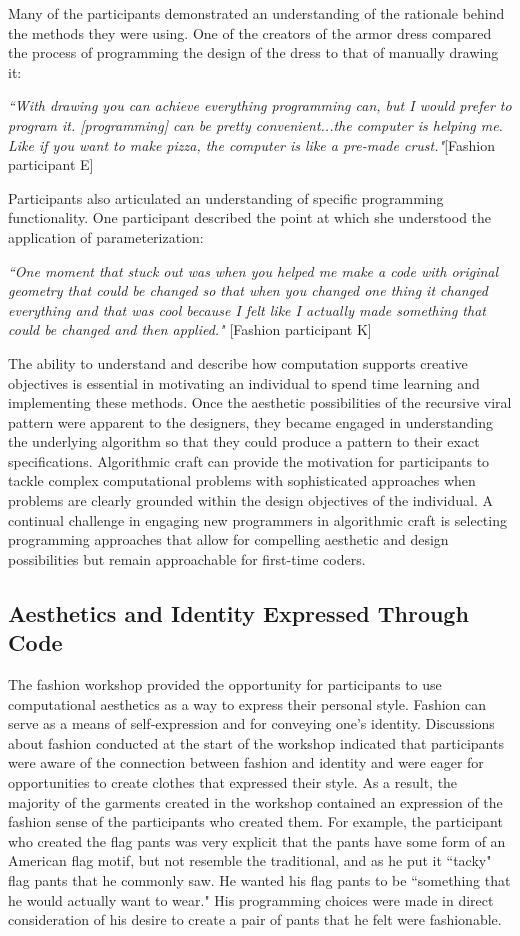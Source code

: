 Many of the participants demonstrated an understanding of the rationale behind the methods they were using. One of the creators of the armor dress compared the process of programming the design of the dress to that of manually drawing it: 

\textit{``With drawing you can achieve everything programming can, but I would prefer to program it. [programming] can be pretty convenient...the computer is helping me. Like if you want to make pizza, the computer is like a pre-made crust."}[Fashion participant E]

Participants also articulated an understanding of specific programming functionality. One participant described the point at which she understood the application 
of parameterization:

\textit{``One moment that stuck out was when you helped me make a code with original geometry that could be changed so that when you changed one thing it changed everything and that was cool because I felt like I actually made something that could be changed and then applied."}
[Fashion participant K]

The ability to understand and describe how computation supports creative objectives is essential in motivating an individual to spend time learning and implementing these methods. Once the aesthetic possibilities of the recursive viral pattern were apparent to the designers, they became engaged in understanding the underlying algorithm so that they could produce a pattern to their exact specifications. Algorithmic craft can provide the motivation for participants to tackle complex computational problems with sophisticated approaches when problems are clearly grounded within the design objectives of the individual. A continual challenge in engaging new programmers in algorithmic craft is  selecting programming approaches that allow for compelling aesthetic and design possibilities but remain approachable for first-time coders. 

\subsection{Aesthetics and Identity Expressed Through Code}
The fashion workshop provided the opportunity for participants to use computational aesthetics as a way to express their personal style. Fashion can serve as a means of self-expression and for conveying one's identity. Discussions about fashion conducted at the start of the workshop indicated that participants were aware of the connection between fashion and identity and were eager for opportunities to create clothes that expressed their style. As a result, the majority of the garments created in the workshop contained an expression of the fashion sense of the participants who created them. For example, the participant who created the flag pants was very explicit that the pants have some form of an American flag motif, but not resemble the traditional, and as he put it ``tacky" flag pants that he commonly saw. He wanted his flag pants to be ``something that he would actually want to wear." His programming choices were made in direct consideration of his desire to create a pair of pants that he felt were fashionable.

